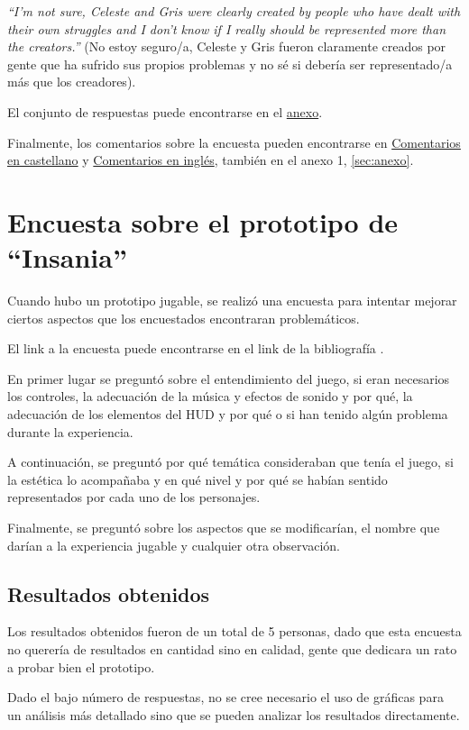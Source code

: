 \documentclass[12pt, a4paper,twoside,titlepage]{book}
\begin{document}
\textit{``I'm not sure, Celeste and Gris were clearly created by people who have dealt with their own struggles and I don't know if I really should be represented more than the creators.''} (No estoy seguro/a, Celeste y Gris fueron claramente creados por gente que ha sufrido sus propios problemas y no sé si debería ser representado/a más que los creadores). 

El conjunto de respuestas puede encontrarse en el \hyperref[representacionIngles]{anexo}.

Finalmente, los comentarios sobre la encuesta pueden encontrarse en \hyperref[comentariosCastellano]{Comentarios en castellano} y \hyperref[comentariosIngles]{Comentarios en inglés}, también en el anexo 1, \ref{sec:anexo}. 




\section{Encuesta sobre el prototipo de ``Insania''}
\label{sec:encuestaDemo}
Cuando hubo un prototipo jugable, se realizó una encuesta para intentar mejorar ciertos aspectos que los encuestados encontraran problemáticos. 

El link a la encuesta puede encontrarse en el link de la bibliografía . 

En primer lugar se preguntó sobre el entendimiento del juego, si eran necesarios los controles, la adecuación de la música y efectos de sonido y por qué, la adecuación de los elementos del HUD y por qué o si han tenido algún problema durante la experiencia. 

A continuación, se preguntó por qué temática consideraban que tenía el juego, si la estética lo acompañaba y en qué nivel y por qué se habían sentido representados por cada uno de los personajes. 

Finalmente, se preguntó sobre los aspectos que se modificarían, el nombre que darían a la experiencia jugable y cualquier otra observación. 


\subsection{Resultados obtenidos}

Los resultados obtenidos fueron de un total de 5 personas, dado que esta encuesta no querería de resultados en cantidad sino en calidad, gente que dedicara un rato a probar bien el prototipo. 

Dado el bajo número de respuestas, no se cree necesario el uso de gráficas para un análisis más detallado sino que se pueden analizar los resultados directamente. 
\end{document}
